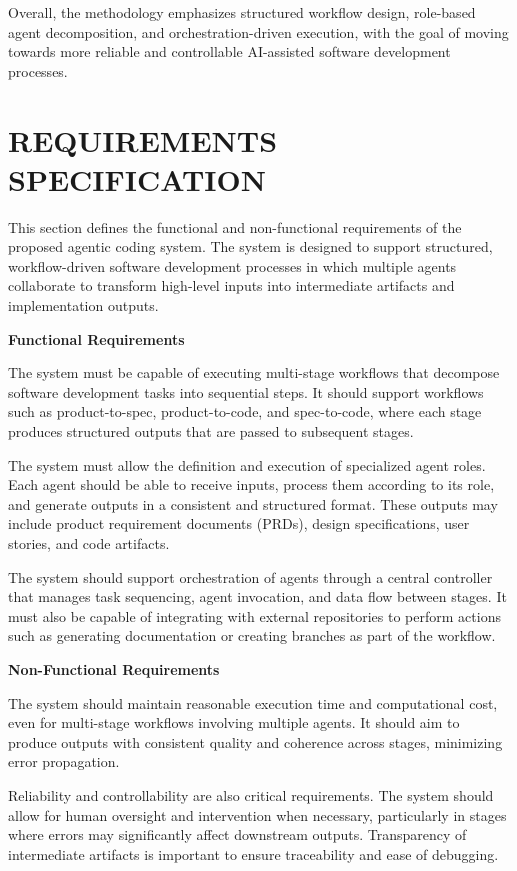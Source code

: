 \documentclass[a4paper,12pt]{report}
\begin{document}
Overall, the methodology emphasizes structured workflow design, role-based agent decomposition, and orchestration-driven execution, with the goal of moving towards more reliable and controllable AI-assisted software development processes.

\chapter{REQUIREMENTS SPECIFICATION}
This section defines the functional and non-functional requirements of the proposed agentic coding system. The system is designed to support structured, workflow-driven software development processes in which multiple agents collaborate to transform high-level inputs into intermediate artifacts and implementation outputs.

\textbf{Functional Requirements}

The system must be capable of executing multi-stage workflows that decompose software development tasks into sequential steps. It should support workflows such as product-to-spec, product-to-code, and spec-to-code, where each stage produces structured outputs that are passed to subsequent stages.

The system must allow the definition and execution of specialized agent roles. Each agent should be able to receive inputs, process them according to its role, and generate outputs in a consistent and structured format. These outputs may include product requirement documents (PRDs), design specifications, user stories, and code artifacts.

The system should support orchestration of agents through a central controller that manages task sequencing, agent invocation, and data flow between stages. It must also be capable of integrating with external repositories to perform actions such as generating documentation or creating branches as part of the workflow.

\textbf{Non-Functional Requirements}

The system should maintain reasonable execution time and computational cost, even for multi-stage workflows involving multiple agents. It should aim to produce outputs with consistent quality and coherence across stages, minimizing error propagation.

Reliability and controllability are also critical requirements. The system should allow for human oversight and intervention when necessary, particularly in stages where errors may significantly affect downstream outputs. Transparency of intermediate artifacts is important to ensure traceability and ease of debugging.
\end{document}
